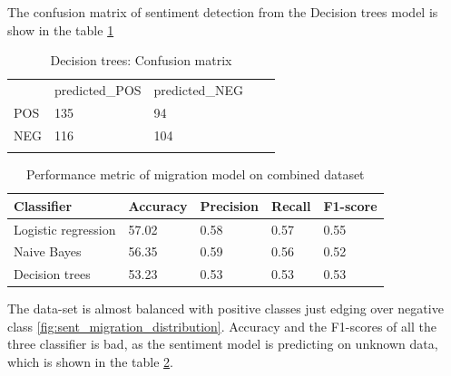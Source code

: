 \begin{itemize}
    The confusion matrix of sentiment detection from the Decision trees model is show in the table \ref{tab:confusionmatrix_sentimentmigrationtweets_DT}
    
    \begin{table}[]
\centering
\begin{tabular}{lllll}
\cline{1-3}
\multicolumn{1}{|l|}{}   & \multicolumn{1}{l|}{predicted\_POS} & \multicolumn{1}{l|}{predicted\_NEG}  &  &  \\ \cline{1-3}
\multicolumn{1}{|l|}{POS} & \multicolumn{1}{l|}{135}  & \multicolumn{1}{l|}{94} &  &  \\ \cline{1-3}
\multicolumn{1}{|l|}{NEG}   & \multicolumn{1}{l|}{116}  & \multicolumn{1}{l|}{104}  &  &  \\ \cline{1-3}
                            &                           &                           &  & 
\end{tabular}
\caption{Decision trees: Confusion matrix}
\label{tab:confusionmatrix_sentimentmigrationtweets_DT}
\end{table}
     
\end{itemize}


\begin{table}[]
\centering
\begin{tabular}{lllll}
\hline
\textbf{Classifier} & \textbf{Accuracy} & \textbf{Precision} & \textbf{Recall} & \textbf{F1-score} \\ \hline
Logistic regression & 57.02             & 0.58              & 0.57          & 0.55              \\ \hline
Naive Bayes & 56.35             & 0.59              & 0.56          & 0.52             \\ \hline
Decision trees & 53.23             & 0.53              & 0.53          & 0.53             \\ \hline

\end{tabular}
\caption{Performance metric of migration model on combined dataset}
\label{tab:sentiment_of_Migration_metric}
\end{table}

  The data-set is almost balanced with positive classes just edging over negative class \ref{fig:sent_migration_distribution}. Accuracy and the F1-scores of all the three classifier is bad, as the sentiment model is predicting on unknown data, which is shown in the table \ref{tab:sentiment_of_Migration_metric}. 